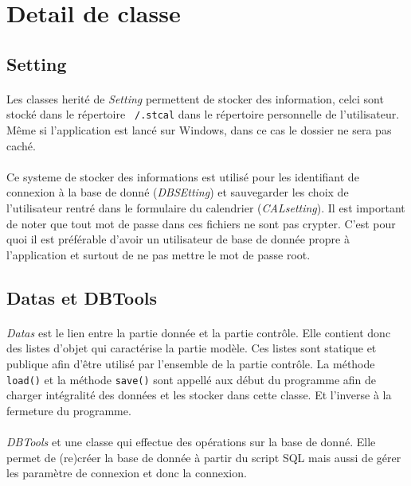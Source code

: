 \documentclass[a4paper,10pt]{report}
\begin{document}
	\section{Detail de classe}

		\subsection{Setting}

			\paragraph*{}
			Les classes herité de \textit{Setting} permettent de stocker des information, celci sont stocké dans le répertoire \texttt{~/.stcal} dans le répertoire personnelle de l'utilisateur. Même si l'application est lancé sur Windows, dans ce cas le dossier ne sera pas caché.
			
			\paragraph*{}
			Ce systeme de stocker des informations est utilisé pour les identifiant de connexion à la base de donné (\textit{DBSEtting}) et sauvegarder les choix de l’utilisateur rentré dans le formulaire du calendrier (\textit{CALsetting}). Il est important de noter que tout mot de passe dans ces fichiers ne sont pas crypter. C'est pour quoi il est préférable d'avoir un utilisateur de base de donnée propre à l'application et surtout de ne pas mettre le mot de passe root.

		\subsection{Datas et DBTools}

			\paragraph*{}
			\textit{Datas} est le lien entre la partie donnée et la partie contrôle. Elle contient donc des listes d’objet qui caractérise la partie modèle. Ces listes sont statique et publique afin d’être utilisé par l’ensemble de la partie contrôle.
			La méthode \texttt{load()} et la méthode \texttt{save()} sont appellé aux début du programme afin de charger intégralité des données et les stocker dans cette classe. Et l'inverse à la fermeture du programme.

			\paragraph*{}
			\textit{DBTools} et une classe qui effectue des opérations sur la base de donné. Elle permet de (re)créer la base de donnée à partir du script SQL mais aussi de gérer les paramètre de connexion et donc la connexion.
\end{document}
